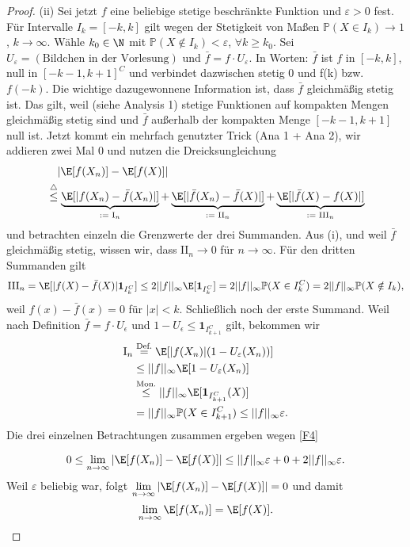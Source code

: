 \begin{proof}
		(ii) Sei jetzt $f$ eine beliebige stetige beschr\"ankte Funktion und $\varepsilon>0$ fest. %
			 F\"ur Intervalle $I_k = [-k,k]$ gilt wegen der Stetigkeit von Maßen $\mathbb{P}(X\in I_k) \to 1$, $k \to \infty$. Wähle $k_0 \in \N$ mit $\mathbb{P}(X \notin I_k) < \varepsilon$, $\forall k \geq k_0$. Sei $U_{\varepsilon} = (\text{Bildchen in der Vorlesung})$ und $\bar f = f \cdot U_{\varepsilon}$. In Worten: $\bar f$ ist $f$ in $[-k,k]$, null in $[-k-1,k+1]^C$ und verbindet dazwischen stetig $0$ und f(k) bzw. $f(-k)$. Die wichtige dazugewonnene Information ist, dass $\bar f$ gleichm\"a\ss ig stetig ist. Das gilt, weil (siehe Analysis 1) stetige Funktionen auf kompakten Mengen gleichm\"a\ss ig stetig sind und $\bar f$ au\ss erhalb der kompakten Menge $[-k-1,k+1]$ null ist. Jetzt kommt ein mehrfach genutzter Trick (Ana 1 + Ana 2), wir addieren zwei Mal $0$ und nutzen die Dreicksungleichung
			 \begin{align}\label{F4}
			 \begin{split}
				 &\quad |\E[f(X_n)] - \E[f(X)]|\\
			 	&\overset{\triangle}{\leq} \underbrace{\E[|f(X_n) - \bar f(X_n)|]}_{:= \text{ I}_n} + \underbrace{\E[|\bar f(X_n) - \bar f(X)|]}_{:= \text{ II}_n} + \underbrace{\E[|\bar f(X) - f(X)|]}_{:= \text{ III}_n}
			\end{split}
			 \end{align}
			 und betrachten einzeln die Grenzwerte der drei Summanden. Aus (i), und weil $\bar f$ gleichmäßig stetig, wissen wir, dass $\text{II}_n \to 0$ f\"ur $n \to \infty$. F\"ur den dritten Summanden gilt
			 \begin{align*}
			 	\text{III}_n = \E[|f(X) - \bar f(X)| \mathbf{1}_{I_k^C}] \leq 2||f||_{\infty} \E[\mathbf{1}_{I_k^C}]
			 	= 2||f||_{\infty} \mathbb{P}(X \in I_k^C)
				= 2||f||_{\infty} \mathbb{P}(X \notin I_k),
			 \end{align*}
			 weil $f(x)-\bar f(x)=0$ f\"ur $|x|<k$. Schlie\ss lich noch der erste Summand. Weil nach Definition $\bar f=f\cdot U_\epsilon$ und $1-U_\epsilon \leq \mathbf 1_{I_{k+1}^C}$ gilt, bekommen wir
			\begin{align*}
			 	\text{I}_n &\overset{\text{Def.}}{=} \E[|f(X_n)|(1-U_{\varepsilon}(X_n))] \\
			 	&\leq ||f||_{\infty} \E[1-U_{\varepsilon}(X_n)]\\
				&\overset{\text{Mon.}}{\leq} ||f||_{\infty} \E[\mathbf{1}_{I_{k+1}^C}(X)]\\
			 	&= ||f||_{\infty} \mathbb{P}(X \in I_{k+1}^C) \leq ||f||_{\infty} \varepsilon.
			 \end{align*}
			 Die drei einzelnen Betrachtungen zusammen ergeben wegen \eqref{F4}
			 
			  \[0\leq \lim\limits_{n \to \infty} |\E[f(X_n)] - \E[f(X)]| \leq ||f||_{\infty} \varepsilon + 0 + 2||f||_{\infty}\varepsilon. \] 
			 Weil $\varepsilon$ beliebig war, folgt $\lim\limits_{n \to \infty} |\E[f(X_n)] - \E[f(X)]|=0$ und damit \[ \lim\limits_{n \to \infty} \E[f(X_n)] = \E[f(X)]. \] 



\end{proof}

